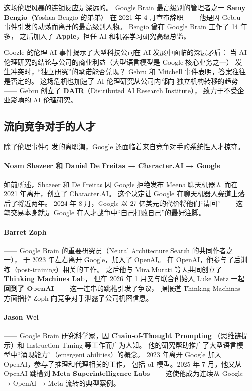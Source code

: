 这场伦理风暴的连锁反应是深远的。
Google Brain 最高级别的管理者之一
\textbf{Samy Bengio}（Yoshua Bengio 的弟弟）
在 2021 年 4 月宣布辞职——
他是因 Gebru 事件引发的动荡而离开的最高级别人物。
Bengio 曾在 Google Brain 工作了 14 年多，
之后加入了 \textbf{Apple}，担任 AI 和机器学习研究高级总监。

\begin{warnbox}[伦理危机的教训]
Google 的伦理 AI 事件揭示了大型科技公司在 AI 发展中面临的深层矛盾：
当 AI 伦理研究的结论与公司的商业利益（大型语言模型是 Google 核心业务之一）
发生冲突时，``独立研究''的承诺能否兑现？
Gebru 和 Mitchell 事件表明，答案往往是否定的。
这场危机也加速了 AI 伦理研究从公司内部向
独立机构转移的趋势——
Gebru 创立了 \textbf{DAIR}（Distributed AI Research Institute），
致力于不受企业影响的 AI 伦理研究。
\end{warnbox}


\subsection{流向竞争对手的人才}
\label{subsec:talent-to-competitors}

除了伦理事件引发的离职潮，Google 还面临着来自竞争对手的系统性人才掠夺。

\paragraph{Noam Shazeer 和 Daniel De Freitas → Character.AI → Google}
如前所述，Shazeer 和 De Freitas 因 Google 拒绝发布 Meena 聊天机器人
而在 2021 年离开，创立了 Character.AI。
这个决定让 Google 在聊天机器人赛道上落后了将近两年。
2024 年 8 月，Google 以 27 亿美元的代价将他们``请回''——
这笔交易本身就是 Google 在人才战争中``自己打败自己''的最好注脚。

\paragraph{Barret Zoph}——
Google Brain 的重要研究员（Neural Architecture Search 的共同作者之一），
于 2023 年左右离开 Google，加入了 OpenAI。
在 OpenAI，他参与了后训练（post-training）相关的工作。
之后他与 Mira Murati 等人共同创立了 \textbf{Thinking Machines Lab}，
但在 2026 年 1 月又与联合创始人 Luke Metz 一起\textbf{回到了 OpenAI}——
这一连串的跳槽引发了争议，
据报道 Thinking Machines 方面指控 Zoph 向竞争对手泄露了公司机密信息。

\paragraph{Jason Wei}——
Google Brain 研究科学家，因 \textbf{Chain-of-Thought Prompting}
（思维链提示）和 Instruction Tuning 等工作而广为人知。
他的研究帮助推广了大型语言模型中``涌现能力''（emergent abilities）的概念。
2023 年离开 Google 加入 OpenAI，参与了推理和代理相关的工作，
包括 o1 模型。2025 年 7 月，他又从 OpenAI 跳槽到
\textbf{Meta Superintelligence Labs}——
这使他成为连续从 Google → OpenAI → Meta 流转的典型案例。

